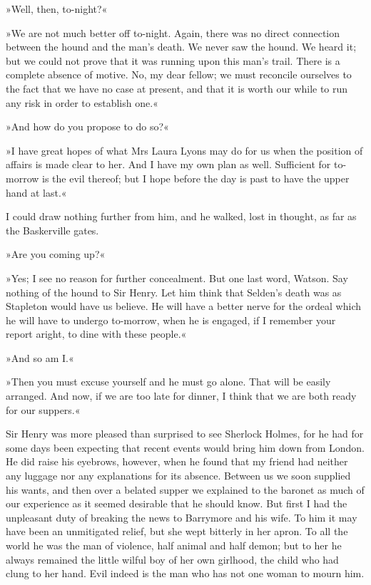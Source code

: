 »Well, then, to-night?«

»We are not much better off to-night. Again, there was no direct connection between the hound and the man's death. We never saw the hound. We heard it; but we could not prove that it was running upon this man's trail. There is a complete absence of motive. No, my dear fellow; we must reconcile ourselves to the fact that we have no case at present, and that it is worth our while to run any risk in order to establish one.«

»And how do you propose to do so?«

»I have great hopes of what Mrs Laura Lyons may do for us when the position of affairs is made clear to her. And I have my own plan as well. Sufficient for to-morrow is the evil thereof; but I hope before the day is past to have the upper hand at last.«

I could draw nothing further from him, and he walked, lost in thought, as far as the Baskerville gates.

»Are you coming up?«

»Yes; I see no reason for further concealment. But one last word, Watson. Say nothing of the hound to Sir Henry. Let him think that Selden's death was as Stapleton would have us believe. He will have a better nerve for the ordeal which he will have to undergo to-morrow, when he is engaged, if I remember your report aright, to dine with these people.«

»And so am I.«

»Then you must excuse yourself and he must go alone. That will be easily arranged. And now, if we are too late for dinner, I think that we are both ready for our suppers.«

Sir Henry was more pleased than surprised to see Sherlock \newline Holmes, for he had for some days been expecting that recent events would bring him down from London. He did raise his eyebrows, however, when he found that my friend had neither any luggage nor any explanations for its absence. Between us we soon supplied his wants, and then over a belated supper we explained to the baronet as much of our experience as it seemed desirable that he should know. But first I had the unpleasant duty of breaking the news to Barrymore and his wife. To him it may have been an unmitigated relief, but she wept bitterly in her apron. To all the world he was the man of violence, half animal and half demon; but to her he always remained the little wilful boy of her own girlhood, the child who had clung to her hand. Evil indeed is the man who has not one woman to mourn him.


